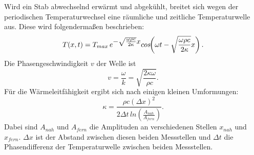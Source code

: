 \noindent Wird ein Stab abwechselnd erwärmt und abgekühlt, breitet sich wegen der periodischen Temperaturwechsel eine räumliche 
und zeitliche Temperaturwelle aus. Diese wird folgendermaßen beschrieben:
\begin{equation*}
    T(x,t) = T_{max} \,  e^{\mathlarger{-\sqrt{\frac{\omega \rho c}{2 \kappa}} x}} cos\!\!\left(\omega t - \sqrt{\frac{\omega \rho c}{2 \kappa}} x\right).
\end{equation*}
Die Phasengeschwindigkeit $v$ der Welle ist
\begin{equation*}
    v= \frac{\omega}{k} = \sqrt{\frac{2\kappa \omega}{\rho c}}.
\end{equation*}
Für die Wärmeleitfähigkeit ergibt sich nach einigen kleinen Umformungen: %
\begin{equation}
    \kappa = \frac{\rho c (\Delta x)^2}{2 \Delta t \, ln\!\!\left(\frac{A_{nah}}{A_{fern}}\right)}.
    \label{eqn:Wärme}
\end{equation}
Dabei sind $A_{nah}$ und $A_{fern}$ die Amplituden an verschiedenen Stellen $x_{nah}$ und $x_{fern}$. $\Delta x$ ist 
der Abstand zwischen diesen beiden Messstellen und $\Delta t$ die Phasendifferenz der Temperaturwelle zwischen beiden 
Messstellen.

